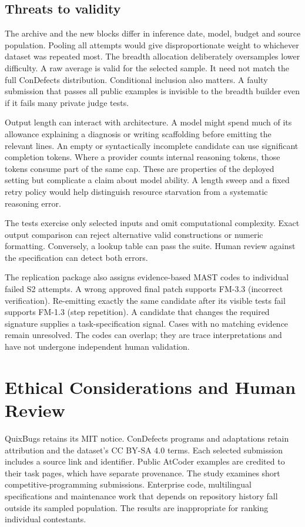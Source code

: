 \documentclass[conference]{IEEEtran}
\begin{document}
\subsection{Threats to validity}
The archive and the new blocks differ in inference date, model, budget and source population. Pooling all attempts would give disproportionate weight to whichever dataset was repeated most. The breadth allocation deliberately oversamples lower difficulty. A raw average is valid for the selected sample. It need not match the full ConDefects distribution. Conditional inclusion also matters. A faulty submission that passes all public examples is invisible to the breadth builder even if it fails many private judge tests.

Output length can interact with architecture. A model might spend much of its allowance explaining a diagnosis or writing scaffolding before emitting the relevant lines. An empty or syntactically incomplete candidate can use significant completion tokens. Where a provider counts internal reasoning tokens, those tokens consume part of the same cap. These are properties of the deployed setting but complicate a claim about model ability. A length sweep and a fixed retry policy would help distinguish resource starvation from a systematic reasoning error.

The tests exercise only selected inputs and omit computational complexity. Exact output comparison can reject alternative valid constructions or numeric formatting. Conversely, a lookup table can pass the suite. Human review against the specification can detect both errors.

The replication package also assigns evidence-based MAST codes to individual failed S2 attempts. A wrong approved final patch supports FM-3.3 (incorrect verification). Re-emitting exactly the same candidate after its visible tests fail supports FM-1.3 (step repetition). A candidate that changes the required signature supplies a task-specification signal. Cases with no matching evidence remain unresolved. The codes can overlap; they are trace interpretations and have not undergone independent human validation.

\section{Ethical Considerations and Human Review}\label{sec:ethics}
QuixBugs retains its MIT notice. ConDefects programs and adaptations retain attribution and the dataset's CC BY-SA 4.0 terms. Each selected submission includes a source link and identifier. Public AtCoder examples are credited to their task pages, which have separate provenance. The study examines short competitive-programming submissions. Enterprise code, multilingual specifications and maintenance work that depends on repository history fall outside its sampled population. The results are inappropriate for ranking individual contestants.
\end{document}
